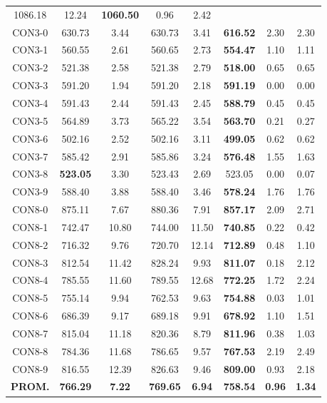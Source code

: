\begin{table}[h]
\begin{tabular}{c c c c c c c c}
1086.18 & 12.24 & \bf{1060.50} & 
0.96 & 2.42\\CON3-0 & 630.73 & 3.44 & 
630.73 & 3.41 & \bf{616.52} & 
2.30 & 2.30\\CON3-1 & 560.55 & 2.61 & 
560.65 & 2.73 & \bf{554.47} & 
1.10 & 1.11\\CON3-2 & 521.38 & 2.58 & 
521.38 & 2.79 & \bf{518.00} & 
0.65 & 0.65\\CON3-3 & 591.20 & 1.94 & 
591.20 & 2.18 & \bf{591.19} & 
0.00 & 0.00\\CON3-4 & 591.43 & 2.44 & 
591.43 & 2.45 & \bf{588.79} & 
0.45 & 0.45\\CON3-5 & 564.89 & 3.73 & 
565.22 & 3.54 & \bf{563.70} & 
0.21 & 0.27\\CON3-6 & 502.16 & 2.52 & 
502.16 & 3.11 & \bf{499.05} & 
0.62 & 0.62\\CON3-7 & 585.42 & 2.91 & 
585.86 & 3.24 & \bf{576.48} & 
1.55 & 1.63\\CON3-8 & \bf{523.05} & 3.30 & 
523.43 & 2.69 & 523.05 & 0.00
 & 0.07\\CON3-9 & 588.40 & 3.88 & 
588.40 & 3.46 & \bf{578.24} & 
1.76 & 1.76\\CON8-0 & 875.11 & 7.67 & 
880.36 & 7.91 & \bf{857.17} & 
2.09 & 2.71\\CON8-1 & 742.47 & 10.80 & 
744.00 & 11.50 & \bf{740.85} & 
0.22 & 0.42\\CON8-2 & 716.32 & 9.76 & 
720.70 & 12.14 & \bf{712.89} & 
0.48 & 1.10\\CON8-3 & 812.54 & 11.42 & 
828.24 & 9.93 & \bf{811.07} & 
0.18 & 2.12\\CON8-4 & 785.55 & 11.60 & 
789.55 & 12.68 & \bf{772.25} & 
1.72 & 2.24\\CON8-5 & 755.14 & 9.94 & 
762.53 & 9.63 & \bf{754.88} & 
0.03 & 1.01\\CON8-6 & 686.39 & 9.17 & 
689.18 & 9.91 & \bf{678.92} & 
1.10 & 1.51\\CON8-7 & 815.04 & 11.18 & 
820.36 & 8.79 & \bf{811.96} & 
0.38 & 1.03\\CON8-8 & 784.36 & 11.68 & 
786.65 & 9.57 & \bf{767.53} & 
2.19 & 2.49\\CON8-9 & 816.55 & 12.39 & 
826.63 & 9.46 & \bf{809.00} & 
0.93 & 2.18\\\bf{PROM.} & 
\bf{766.29} & \bf{7.22} & \bf{769.65} & \bf{6.94} & \bf{758.54} & \bf{0.96} & \bf{1.34}\\[1ex]\hline
\end{tabular}
\label{table:SS-M-100-1.0}
\end{table}

